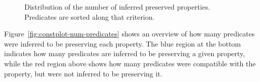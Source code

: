 \documentclass[11pt]{article}
\begin{document}
\begin{figure}[ht]
  \caption[Distribution of the number of inferred preserved properties]{Distribution of the number of inferred preserved properties. Predicates are sorted along that criterion.}
  \label{fig:constplot-num-properties}
\end{figure}

Figure~\ref{fig:constplot-num-predicates} shows an overview  of how many
predicates were inferred  to be preserving each property. The  blue region at
the bottom  indicates how  many predicates  are inferred  to be  preserving a
given property,  while the red  region above  shows how many  predicates were
compatible with the property, but were not inferred to be preserving it.
\end{document}
